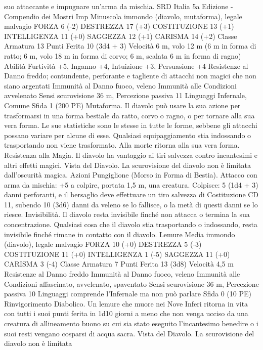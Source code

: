 \begin{multicols}{2}
suo attaccante e impugnare un’arma da mischia.
SRD Italia 5a Edizione - Compendio dei Mostri
Imp
Minuscola immondo (diavolo, mutaforma), legale malvagio
FORZA 6 (-2)
DESTREZZA 17 (+3)
COSTITUZIONE 13 (+1)
INTELLIGENZA 11 (+0)
SAGGEZZA 12 (+1)
CARISMA 14 (+2)
Classe Armatura 13
Punti Ferita 10 (3d4 + 3)
Velocità 6 m, volo 12 m (6 m in forma di ratto; 6 m, volo 18 m
in forma di corvo; 6 m, scalata 6 m in forma di ragno)
Abilità Furtività +5, Inganno +4, Intuizione +3, Persuasione +4
Resistenze al Danno freddo; contundente, perforante e tagliente
di attacchi non magici che non siano argentati
Immunità al Danno fuoco, veleno
Immunità alle Condizioni avvelenato
Sensi scurovisione 36 m, Percezione passiva 11
Linguaggi Infernale, Comune
Sfida 1 (200 PE)
Mutaforma. Il diavolo può usare la sua azione per trasformarsi
in una forma bestiale da ratto, corvo o ragno, o per tornare alla
sua vera forma. Le sue statistiche sono le stesse in tutte le forme,
sebbene gli attacchi possano variare per alcune di esse. Qualsiasi
equipaggiamento stia indossando o trasportando non viene
trasformato. Alla morte ritorna alla sua vera forma.
Resistenza alla Magia. Il diavolo ha vantaggio ai tiri salvezza
contro incantesimi e altri effetti magici.
Vista del Diavolo. La scurovisione del diavolo non è limitata
dall’oscurità magica.
Azioni
Pungiglione (Morso in Forma di Bestia). Attacco con arma da
mischia: +5 a colpire, portata 1,5 m, una creatura.
Colpisce: 5 (1d4 + 3) danni perforanti, e il bersaglio deve
effettuare un tiro salvezza di Costituzione CD 11, subendo 10
(3d6) danni da veleno se lo fallisce, o la metà di questi danni se
lo riesce.
Invisibilità. Il diavolo resta invisibile finché non attacca o
termina la sua concentrazione. Qualsiasi cosa che il diavolo stia
trasportando o indossando, resta invisibile finché rimane in
contatto con il diavolo.
Lemure
Media immondo (diavolo), legale malvagio
FORZA 10 (+0)
DESTREZZA 5 (-3)
COSTITUZIONE 11 (+0)
INTELLIGENZA 1 (-5)
SAGGEZZA 11 (+0)
CARISMA 3 (-4)
Classe Armatura 7
Punti Ferita 13 (3d8)
Velocità 4,5 m
Resistenze al Danno freddo
Immunità al Danno fuoco, veleno
Immunità alle Condizioni affascinato, avvelenato, spaventato
Sensi scurovisione 36 m, Percezione passiva 10
Linguaggi comprende l’Infernale ma non può parlare
Sfida 0 (10 PE)
Rinvigorimento Diabolico. Un lemure che muore nei Nove
Inferi ritorna in vita con tutti i suoi punti ferita in 1d10 giorni a
meno che non venga ucciso da una creatura di allineamento
buono su cui sia stato eseguito l’incantesimo benedire o i suoi
resti vengano cosparsi di acqua sacra.
Vista del Diavolo. La scurovisione del diavolo non è limitata

\end{multicols}
